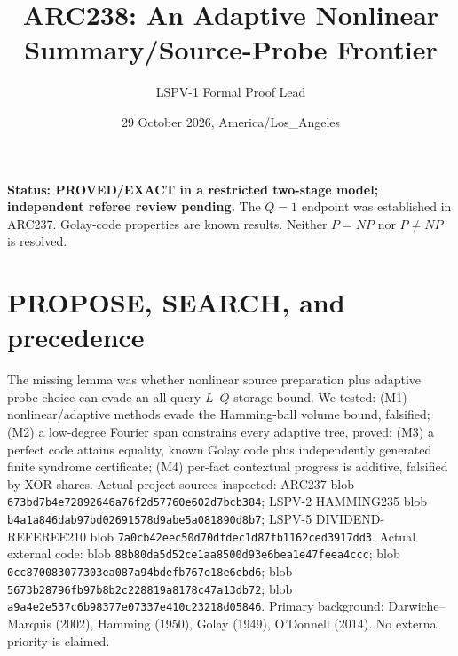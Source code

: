 \documentclass[10pt]{article}
\title{ARC238: An Adaptive Nonlinear Summary/Source-Probe Frontier}
\author{LSPV-1 Formal Proof Lead}
\date{29 October 2026, America/Los\_Angeles}
\begin{document}
\maketitle
\noindent\textbf{Status: PROVED/EXACT in a restricted two-stage model; independent referee review pending.} The $Q=1$ endpoint was established in ARC237. Golay-code properties are known results. Neither $P=NP$ nor $P\ne NP$ is resolved.
\section{PROPOSE, SEARCH, and precedence}
The missing lemma was whether nonlinear source preparation plus adaptive probe choice can evade an all-query $L$--$Q$ storage bound. We tested: (M1) nonlinear/adaptive methods evade the Hamming-ball volume bound, falsified; (M2) a low-degree Fourier span constrains every adaptive tree, proved; (M3) a perfect code attains equality, known Golay code plus independently generated finite syndrome certificate; (M4) per-fact contextual progress is additive, falsified by XOR shares.
Actual project sources inspected: ARC237 blob \texttt{673bd7b4e72892646a76f2d57760e602d7bcb384}; LSPV-2 HAMMING235 blob \texttt{b4a1a846dab97bd02691578d9abe5a081890d8b7}; LSPV-5 DIVIDEND-REFEREE210 blob \texttt{7a0cb42eec50d70dfdec1d87fb1162ced3917dd3}. Actual external code:  blob \texttt{88b80da5d52ce1aa8500d93e6bea1e47feea4ccc};  blob \texttt{0cc870083077303ea087a94bdefb767e18e6ebd6};  blob \texttt{5673b28796fb97b8b2c228819a8178c47a13db72};  blob \texttt{a9a4e2e537c6b98377e07337e410c23218d05846}. Primary background: Darwiche--Marquis (2002), Hamming (1950), Golay (1949), O'Donnell (2014). No external priority is claimed.
\end{document}
